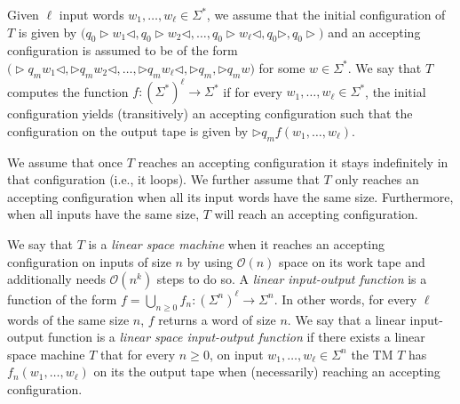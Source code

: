 Given $\ell$ input words $w_1,\ldots,w_\ell\in\Sigma^*$, we assume that the initial configuration of $T$ is given by
 $\bigl(q_0\rhd  w_1\lhd,q_0\rhd w_2\lhd,\ldots, q_0\rhd w_\ell\lhd,q_0\rhd, q_0\rhd \bigr)$ and an accepting configuration is assumed to be of the form $\bigl(\rhd q_m w_1\lhd,\rhd q_m w_2\lhd,\ldots, \rhd q_m w_\ell\lhd,\rhd q_m,\rhd q_m w\bigr)$ for some $w\in\Sigma^*$. We say that $T$ computes the function $f:(\Sigma^*)^{\ell}\to\Sigma^*$ if for every $w_1,\ldots,w_\ell\in\Sigma^*$, the initial configuration yields (transitively) an accepting configuration such that the configuration on the output tape is
 given by $\rhd q_m f(w_1,\ldots,w_\ell)$.

We assume that once $T$ reaches an accepting configuration it stays indefinitely in that configuration (i.e., it loops). We further assume that $T$ only reaches an accepting configuration when all its input
words have the same size. Furthermore, when all inputs have the same size, $T$ will reach an accepting configuration. 


We say that $T$ is a \textit{linear space machine} when it reaches an accepting configuration 
on inputs of size $n$ by using $\mathcal{O}(n)$ space on its work tape and additionally needs  $\mathcal{O}(n^k)$ steps to do so. A \textit{linear input-output function} is a function of the form $f=\bigcup_{n\geq 0} f_n:(\Sigma^n)^\ell\to\Sigma^n$. In other words, for every $\ell$ words of the same size $n$, $f$ returns a word of size $n$. We say that a linear input-output function is a \textit{linear space input-output function} if
there exists a linear space machine  $T$ that for every $n\geq 0$, on input $w_1,\ldots,w_\ell\in\Sigma^n$ the TM $T$ has
$f_n(w_1,\ldots,w_\ell)$ on its the output tape when (necessarily) reaching an accepting configuration.

